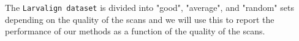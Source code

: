 \documentclass{book}
\begin{document}
	The \texttt{Larvalign dataset} is divided into "good", "average", and "random" sets depending on the quality of the scans and we will use this to report the performance of our methods as a function of the quality of the scans.	

\end{document}
